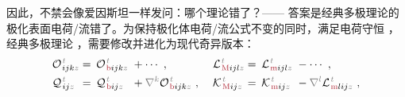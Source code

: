 因此，不禁会像爱因斯坦一样发问：哪个理论错了？—— 答案是经典多极理论的极化表面电荷/流错了。为保持极化体电荷/流公式不变的同时，满足电荷守恒 ，经典多极理论 ，需要修改并进化为现代奇异版本：
\begin{subequations} \label{eq:multipole-modify}
\begin{align}
	&{\mathcal{O}}^{\;\!\mathcolor{gray}{t}}_{\;\! ijk \mathcolor{gray}{z}} \hspace{-1em}&&=\hspace{0.2em} {\mathcal{O}}^{\;\!\mathcolor{gray}{t}}_{\;\!\textcolor{Maroon}{\text{b}} ijk \mathcolor{gray}{z}} &&\hspace{-0.7em}+ \cdots~, &&\hspace{0.3em} {\mathcal{L}}^{\;\!\mathcolor{gray}{t}}_{\;\!\textcolor{Maroon}{\text{M}} ijl \mathcolor{gray}{z}} \hspace{-1em}&&=\hspace{0.2em} {\mathcal{L}}^{\;\!\mathcolor{gray}{t}}_{\;\!\textcolor{Maroon}{\text{m}} ijl \mathcolor{gray}{z}} &&\hspace{-0.7em}- \cdots~, \label{eq:Ob-Lm-modify} \\
	&{\mathcal{Q}}^{\;\!\mathcolor{gray}{t}}_{\;\! ij \mathcolor{gray}{z}} \hspace{-1em}&&=\hspace{0.2em} {\mathcal{Q}}^{\;\!\mathcolor{gray}{t}}_{\;\!\textcolor{Maroon}{\text{b}} ij \mathcolor{gray}{z}} &&\hspace{-0.7em}+ \mathcolor{gray}{\nabla^k} {\mathcal{O}}^{\;\!\mathcolor{gray}{t}}_{\;\!\textcolor{Maroon}{\text{b}} ijk \mathcolor{gray}{z}}~,  &&\hspace{0.3em} {\mathcal{K}}^{\;\!\mathcolor{gray}{t}}_{\;\!\textcolor{Maroon}{\text{M}} ij \mathcolor{gray}{z}} \hspace{-1em}&&=\hspace{0.2em} {\mathcal{K}}^{\;\!\mathcolor{gray}{t}}_{\;\!\textcolor{Maroon}{\text{m}} ij \mathcolor{gray}{z}} &&\hspace{-0.7em}- \mathcolor{gray}{\nabla^l} {\mathcal{L}}^{\;\!\mathcolor{gray}{t}}_{\;\!\textcolor{Maroon}{\text{m}} lij \mathcolor{gray}{z}}~, \label{eq:Qb-Km-modify} \\

\end{align}
\end{subequations}
